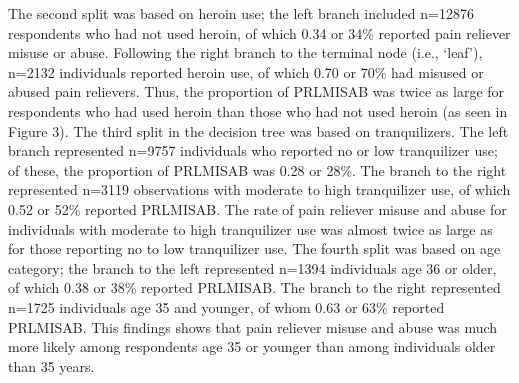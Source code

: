 The second split was based on heroin use; the left branch included n=12876 
respondents who had not used heroin, of which 0.34 or 34\% reported pain
reliever misuse or abuse. Following the right branch to the terminal node 
(i.e., `leaf'), n=2132 individuals reported heroin use, of which 0.70 or 
70\% had misused or abused pain relievers. Thus, the proportion of PRLMISAB 
was twice as large for respondents who had used heroin than those who had 
not used heroin (as seen in Figure 3). The third split in the decision tree
was based on tranquilizers. The left branch represented n=9757 individuals 
who reported no or low tranquilizer use; of these, the proportion of 
PRLMISAB was 0.28 or 28\%. The branch to the right represented n=3119 
observations with moderate to high tranquilizer use, of which 0.52 or 52\% 
reported PRLMISAB. The rate of pain reliever misuse and abuse for individuals 
with moderate to high tranquilizer use was almost twice as large as for 
those reporting no to low tranquilizer use. The fourth split was based on age 
category; the branch to the left represented n=1394 individuals age 36 or older, 
of which 0.38 or 38\% reported PRLMISAB. The branch to the right represented 
n=1725 individuals age 35 and younger, of whom 0.63 or 63\% reported PRLMISAB. 
This findings shows that pain reliever misuse and abuse was much more likely
among respondents age 35 or younger than among individuals older than 35 years. 






